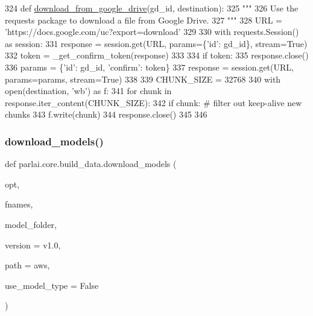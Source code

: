 \begin{DoxyCode}
324 \textcolor{keyword}{def }\hyperlink{namespaceparlai_1_1core_1_1build__data_ac9224da5c4e4ce9d1f4ab05e837c1f45}{download\_from\_google\_drive}(gd\_id, destination):
325     \textcolor{stringliteral}{"""}
326 \textcolor{stringliteral}{    Use the requests package to download a file from Google Drive.}
327 \textcolor{stringliteral}{    """}
328     URL = \textcolor{stringliteral}{'https://docs.google.com/uc?export=download'}
329 
330     with requests.Session() \textcolor{keyword}{as} session:
331         response = session.get(URL, params=\{\textcolor{stringliteral}{'id'}: gd\_id\}, stream=\textcolor{keyword}{True})
332         token = \_get\_confirm\_token(response)
333 
334         \textcolor{keywordflow}{if} token:
335             response.close()
336             params = \{\textcolor{stringliteral}{'id'}: gd\_id, \textcolor{stringliteral}{'confirm'}: token\}
337             response = session.get(URL, params=params, stream=\textcolor{keyword}{True})
338 
339         CHUNK\_SIZE = 32768
340         with open(destination, \textcolor{stringliteral}{'wb'}) \textcolor{keyword}{as} f:
341             \textcolor{keywordflow}{for} chunk \textcolor{keywordflow}{in} response.iter\_content(CHUNK\_SIZE):
342                 \textcolor{keywordflow}{if} chunk:  \textcolor{comment}{# filter out keep-alive new chunks}
343                     f.write(chunk)
344         response.close()
345 
346 
\end{DoxyCode}
\mbox{\label{namespaceparlai_1_1core_1_1build__data_ab697f23f05d3e36d7979fe5e0ed7911e}} 
\subsubsection{\texorpdfstring{download\+\_\+models()}{download\_models()}}
{\footnotesize\ttfamily def parlai.\+core.\+build\+\_\+data.\+download\+\_\+models (\begin{DoxyParamCaption}\item[{}]{opt,  }\item[{}]{fnames,  }\item[{}]{model\+\_\+folder,  }\item[{}]{version = {\ttfamily \textquotesingle{}v1.0\textquotesingle{}},  }\item[{}]{path = {\ttfamily \textquotesingle{}aws\textquotesingle{}},  }\item[{}]{use\+\_\+model\+\_\+type = {\ttfamily False} }\end{DoxyParamCaption})}

